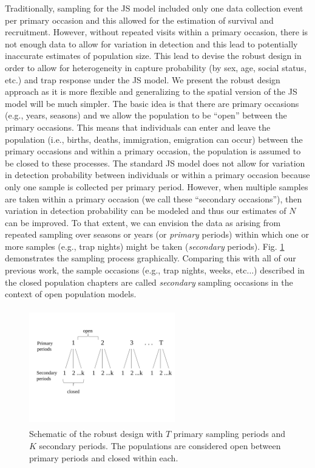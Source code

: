 Traditionally, sampling for the JS model included only one data
collection event per primary occasion and this allowed for the
estimation of survival and recruitment.  However, without repeated
visits within a primary occasion, there is not enough data to allow
for variation in detection and this lead to potentially inaccurate
estimates of population size.  This lead \citet{pollock:1982} to
devise the robust design in order to allow for heterogeneity in
capture probability (by sex, age, social status, etc.) and trap
response under the JS model.  We present the robust design approach as
it is more flexible and generalizing to the spatial version of the JS
model will be much simpler.  The basic idea is that there are primary
occasions (e.g., years, seasons) and we allow the population to be
``open'' between the primary occasions.  This means that individuals
can enter and leave the population (i.e., births, deaths, immigration,
emigration can occur) between the primary occasions and within a
primary occasion, the population is assumed to be closed to these
processes.  The standard JS model does not allow for variation in
detection probability between individuals or within a primary occasion
because only one sample is collected per primary period.  However,
when multiple samples are taken within a primary occasion (we call
these ``secondary occasions''), then variation in detection
probability can be modeled and thus our estimates of $N$ can be
improved.  To that extent, we can envision the data as arising from
repeated sampling over seasons or years (or {\it primary} periods)
within which one or more samples (e.g., trap nights) might be taken
({\it secondary} periods). Fig. \ref{open.figs.robustdesign}
demonstrates the sampling process graphically.  Comparing this with
all of our previous work, the sample occasions (e.g., trap nights,
weeks, etc$\dots$) described in the closed population chapters are
called {\it secondary} sampling occasions in the context of open
population models.



\begin{figure}[h]
\centering
\includegraphics[height=2in,width=2.5in]{Ch16-Open/figs/RobustDesign.pdf}
\caption{Schematic of the robust design with $T$ primary sampling periods and $K$ secondary periods. The populations
are considered open between primary periods and closed within each.}
\label{open.figs.robustdesign}
\end{figure}

